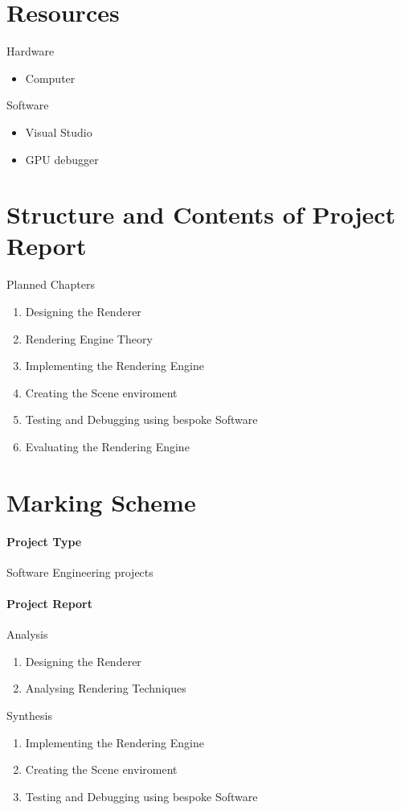 \section{Resources}
Hardware
\begin{itemize}
  \item Computer
  
\end{itemize}
Software
\begin{itemize}
  \item Visual Studio
  \item GPU debugger
\end{itemize}

\section{Structure and Contents of Project Report}
Planned Chapters
\begin{enumerate}
  \item Designing the Renderer
  \item Rendering Engine Theory
  \item Implementing the Rendering Engine
  \item Creating the Scene enviroment
  \item Testing and Debugging using bespoke Software
  \item Evaluating the Rendering Engine
\end{enumerate}

\section{Marking Scheme}
\paragraph{Project Type}Software Engineering projects

\paragraph{Project Report} 
Analysis 
\begin{enumerate}
  \item Designing the Renderer
  \item Analysing Rendering Techniques
\end{enumerate}

Synthesis 
\begin{enumerate}
  \item Implementing the Rendering Engine
  \item Creating the Scene enviroment
  \item Testing and Debugging using bespoke Software
\end{enumerate}

